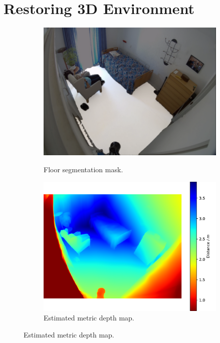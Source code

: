 \section{Restoring 3D Environment}
\begin{figure}
    \centering
    \begin{subfigure}[b]{0.4\textwidth}
        \includegraphics[width=\linewidth]{figures/floor.png}
        \label{fig:floor-mask}
        \caption{Floor segmentation mask.}
    \end{subfigure}
    \hfill
    \begin{subfigure}[b]{0.5\textwidth}
        \includegraphics[width=\linewidth]{figures/depth.pdf}
        \caption{Estimated metric depth map.}
    \end{subfigure}
\end{figure}

